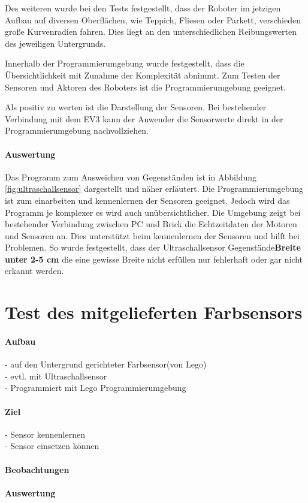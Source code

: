 Des weiteren wurde bei den Tests festgestellt, dass der Roboter im jetzigen Aufbau auf diversen Oberflächen, wie Teppich, Fliesen oder Parkett, verschieden große Kurvenradien fahren. Dies liegt an den unterschiedlichen Reibungswerten des jeweiligen Untergrunds.

Innerhalb der Programmierumgebung wurde festgestellt, dass die Übersichtlichkeit mit Zunahme der Komplexität abnimmt. Zum Testen der Sensoren und Aktoren des Roboters ist die Programmierumgebung geeignet.

Als positiv zu werten ist die Darstellung der Sensoren. Bei bestehender Verbindung mit dem EV3 kann der Anwender die Sensorwerte direkt in der Programmierumgebung nachvollziehen.

\paragraph{Auswertung}
Das Programm zum Ausweichen von Gegenständen ist in Abbildung \vref{fig:ultraschallsensor} dargestellt und näher erläutert. Die Programmierumgebung ist zum einarbeiten und kennenlernen der Sensoren geeignet. Jedoch wird das Programm je komplexer es wird auch unübersichtlicher. Die Umgebung zeigt bei bestehender Verbindung zwischen PC und Brick die Echtzeitdaten der Motoren und Sensoren an. Dies unterstützt beim kennenlernen der Sensoren und hilft bei Problemen. So wurde festgestellt, dass der Ultraschallsensor Gegenstände\textbf{Breite unter 2-5 cm} die eine gewisse Breite nicht erfüllen nur fehlerhaft oder gar nicht erkannt werden.  

\section{Test des mitgelieferten Farbsensors}
\paragraph{Aufbau}
- auf den Untergrund gerichteter Farbsensor(von Lego)\\
- evtl. mit Ultraschallsensor\\
- Programmiert mit Lego Programmierumgebung\\

\paragraph{Ziel}
- Sensor kennenlernen\\
- Sensor einsetzen können\\

\paragraph{Beobachtungen}
\paragraph{Auswertung}